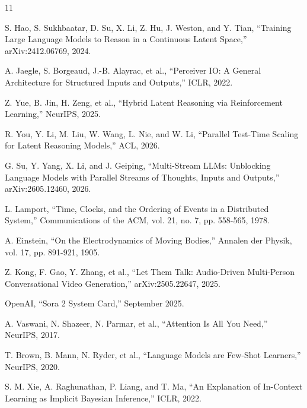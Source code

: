 \documentclass[10pt,twocolumn]{article}
\begin{document}
\begin{thebibliography}{11}
\small

S. Hao, S. Sukhbaatar, D. Su, X. Li, Z. Hu, J. Weston, and Y. Tian,
``Training Large Language Models to Reason in a Continuous Latent Space,''
arXiv:2412.06769, 2024.

A. Jaegle, S. Borgeaud, J.-B. Alayrac, et al.,
``Perceiver IO: A General Architecture for Structured Inputs and Outputs,''
ICLR, 2022.

Z. Yue, B. Jin, H. Zeng, et al.,
``Hybrid Latent Reasoning via Reinforcement Learning,''
NeurIPS, 2025.

R. You, Y. Li, M. Liu, W. Wang, L. Nie, and W. Li,
``Parallel Test-Time Scaling for Latent Reasoning Models,''
ACL, 2026.

G. Su, Y. Yang, X. Li, and J. Geiping,
``Multi-Stream LLMs: Unblocking Language Models with Parallel Streams of Thoughts, Inputs and Outputs,''
arXiv:2605.12460, 2026.

L. Lamport,
``Time, Clocks, and the Ordering of Events in a Distributed System,''
Communications of the ACM, vol. 21, no. 7, pp. 558-565, 1978.

A. Einstein,
``On the Electrodynamics of Moving Bodies,''
Annalen der Physik, vol. 17, pp. 891-921, 1905.

Z. Kong, F. Gao, Y. Zhang, et al.,
``Let Them Talk: Audio-Driven Multi-Person Conversational Video Generation,''
arXiv:2505.22647, 2025.

OpenAI,
``Sora 2 System Card,''
September 2025.

A. Vaswani, N. Shazeer, N. Parmar, et al.,
``Attention Is All You Need,''
NeurIPS, 2017.

T. Brown, B. Mann, N. Ryder, et al.,
``Language Models are Few-Shot Learners,''
NeurIPS, 2020.

S. M. Xie, A. Raghunathan, P. Liang, and T. Ma,
``An Explanation of In-Context Learning as Implicit Bayesian Inference,''
ICLR, 2022.

\end{thebibliography}
\end{document}
